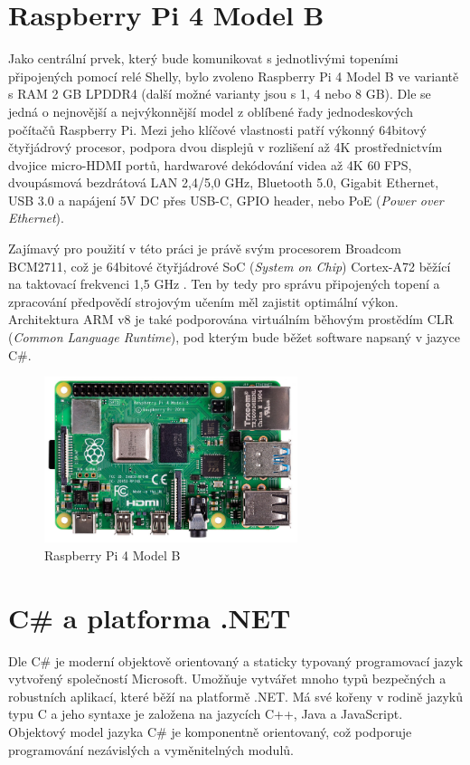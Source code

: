 \section{Raspberry Pi 4 Model B}
Jako centrální prvek, který bude komunikovat s jednotlivými topeními připojených pomocí relé Shelly, bylo zvoleno Raspberry Pi 4 Model B ve variantě s RAM 2 GB LPDDR4 (další možné varianty jsou s 1, 4 nebo 8 GB). Dle \cite{raspberry_pi} se jedná o nejnovější a nejvýkonnější model z oblíbené řady jednodeskových počítačů Raspberry Pi. Mezi jeho klíčové vlastnosti patří výkonný 64bitový čtyřjádrový procesor, podpora dvou displejů v rozlišení až 4K prostřednictvím dvojice micro-HDMI portů, hardwarové dekódování videa až 4K 60 FPS, dvoupásmová bezdrátová LAN 2,4/5,0 GHz, Bluetooth 5.0, Gigabit Ethernet, USB 3.0 a napájení 5V DC přes USB-C, GPIO header, nebo PoE ({\it Power over Ethernet}).

Zajímavý pro použití v této práci je právě svým procesorem Broadcom BCM2711, což je 64bitové čtyřjádrové SoC ({\it System on Chip}) Cortex-A72 běžící na taktovací frekvenci 1,5 GHz \cite{raspberry_pi}. Ten by tedy pro správu připojených topení a zpracování předpovědí strojovým učením měl zajistit optimální výkon. Architektura ARM v8 je také podporována virtuálním běhovým prostědím CLR ({\it Common Language Runtime}), pod kterým bude běžet software napsaný v jazyce C\#.

\begin{figure}[hbt]
\centering
\includegraphics[width=0.66\textwidth]{obrazky-figures/raspberrypi.png}
\caption{Raspberry Pi 4 Model B}
\end{figure}

\section{C\# a platforma .NET}
Dle \cite{c_sharp} C\# je moderní objektově orientovaný a staticky typovaný programovací jazyk vytvořený společností Microsoft. Umožňuje vytvářet mnoho typů bezpečných a robustních aplikací, které běží na platformě .NET. Má své kořeny v rodině jazyků typu C a jeho syntaxe je založena na jazycích C++, Java a JavaScript. Objektový model jazyka C\# je komponentně orientovaný, což podporuje programování nezávislých a vyměnitelných modulů.

